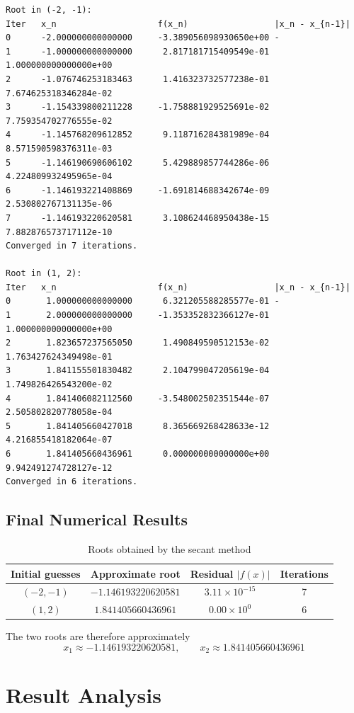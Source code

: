 \documentclass[12pt,a4paper]{article}
\begin{document}
\begin{lstlisting}
Root in (-2, -1):
Iter   x_n                    f(x_n)                 |x_n - x_{n-1}|
0      -2.000000000000000     -3.389056098930650e+00 -
1      -1.000000000000000      2.817181715409549e-01 1.000000000000000e+00
2      -1.076746253183463      1.416323732577238e-01 7.674625318346284e-02
3      -1.154339800211228     -1.758881929525691e-02 7.759354702776555e-02
4      -1.145768209612852      9.118716284381989e-04 8.571590598376311e-03
5      -1.146190690606102      5.429889857744286e-06 4.224809932495965e-04
6      -1.146193221408869     -1.691814688342674e-09 2.530802767131135e-06
7      -1.146193220620581      3.108624468950438e-15 7.882876573717112e-10
Converged in 7 iterations.

Root in (1, 2):
Iter   x_n                    f(x_n)                 |x_n - x_{n-1}|
0       1.000000000000000      6.321205588285577e-01 -
1       2.000000000000000     -1.353352832366127e-01 1.000000000000000e+00
2       1.823657237565050      1.490849590512153e-02 1.763427624349498e-01
3       1.841155501830482      2.104799047205619e-04 1.749826426543200e-02
4       1.841406082112560     -3.548002502351544e-07 2.505802820778058e-04
5       1.841405660427018      8.365669268428633e-12 4.216855418182064e-07
6       1.841405660436961      0.000000000000000e+00 9.942491274728127e-12
Converged in 6 iterations.
\end{lstlisting}

\subsection*{Final Numerical Results}

\begin{table}[H]
\centering
\caption{Roots obtained by the secant method}
\begin{tabular}{cccc}
\toprule
Initial guesses & Approximate root & Residual $|f(x)|$ & Iterations \\
\midrule
$(-2,-1)$ & $-1.146193220620581$ & $3.11\times 10^{-15}$ & 7 \\
$(1,2)$   & $ 1.841405660436961$ & $0.00\times 10^{0}$  & 6 \\
\bottomrule
\end{tabular}
\end{table}

The two roots are therefore approximately
\[
x_1\approx -1.146193220620581,\qquad x_2\approx 1.841405660436961
\]

\section{Result Analysis}
\end{document}
